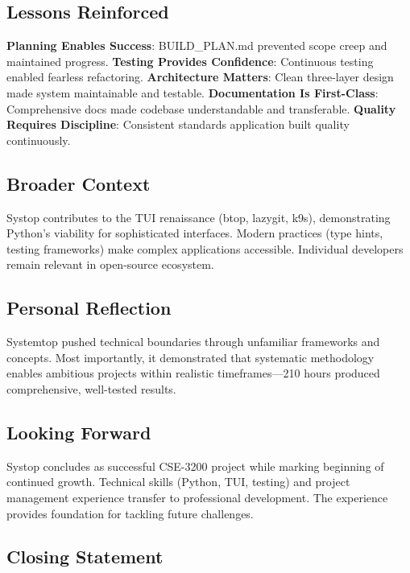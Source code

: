 \documentclass[12pt,a4paper,oneside]{report}
\begin{document}
\subsection{Lessons Reinforced}

\textbf{Planning Enables Success}: BUILD\_PLAN.md prevented scope creep and maintained progress.
\textbf{Testing Provides Confidence}: Continuous testing enabled fearless refactoring.
\textbf{Architecture Matters}: Clean three-layer design made system maintainable and testable.
\textbf{Documentation Is First-Class}: Comprehensive docs made codebase understandable and transferable.
\textbf{Quality Requires Discipline}: Consistent standards application built quality continuously.

\subsection{Broader Context}

Systop contributes to the TUI renaissance (btop, lazygit, k9s), demonstrating Python's viability for sophisticated interfaces. Modern practices (type hints, testing frameworks) make complex applications accessible. Individual developers remain relevant in open-source ecosystem.

\subsection{Personal Reflection}

Systemtop pushed technical boundaries through unfamiliar frameworks and concepts. Most importantly, it demonstrated that systematic methodology enables ambitious projects within realistic timeframes---210 hours produced comprehensive, well-tested results.

\subsection{Looking Forward}

Systop concludes as successful CSE-3200 project while marking beginning of continued growth. Technical skills (Python, TUI, testing) and project management experience transfer to professional development. The experience provides foundation for tackling future challenges.

\subsection{Closing Statement}
\end{document}
